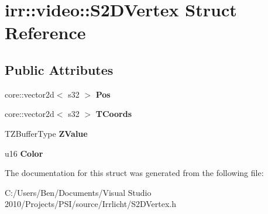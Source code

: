 \hypertarget{structirr_1_1video_1_1_s2_d_vertex}{\section{irr\-:\-:video\-:\-:S2\-D\-Vertex Struct Reference}
\label{structirr_1_1video_1_1_s2_d_vertex}
}
\subsection*{Public Attributes}
\begin{DoxyCompactItemize}
\item 
\hypertarget{structirr_1_1video_1_1_s2_d_vertex_a5b6f9db0cc8fd29455dea77eba436c4a}{core\-::vector2d$<$ s32 $>$ {\bfseries Pos}}\label{structirr_1_1video_1_1_s2_d_vertex_a5b6f9db0cc8fd29455dea77eba436c4a}

\item 
\hypertarget{structirr_1_1video_1_1_s2_d_vertex_a63c06761fdce709060ef45b67378ac2c}{core\-::vector2d$<$ s32 $>$ {\bfseries T\-Coords}}\label{structirr_1_1video_1_1_s2_d_vertex_a63c06761fdce709060ef45b67378ac2c}

\item 
\hypertarget{structirr_1_1video_1_1_s2_d_vertex_a1cb782a5f96fd9396fd16475e0ff05df}{T\-Z\-Buffer\-Type {\bfseries Z\-Value}}\label{structirr_1_1video_1_1_s2_d_vertex_a1cb782a5f96fd9396fd16475e0ff05df}

\item 
\hypertarget{structirr_1_1video_1_1_s2_d_vertex_a33a8de13acaeabbfe060392460e6cf1d}{u16 {\bfseries Color}}\label{structirr_1_1video_1_1_s2_d_vertex_a33a8de13acaeabbfe060392460e6cf1d}

\end{DoxyCompactItemize}


The documentation for this struct was generated from the following file\-:\begin{DoxyCompactItemize}
\item 
C\-:/\-Users/\-Ben/\-Documents/\-Visual Studio 2010/\-Projects/\-P\-S\-I/source/\-Irrlicht/S2\-D\-Vertex.\-h\end{DoxyCompactItemize}
